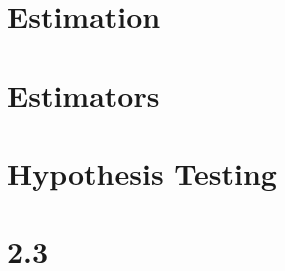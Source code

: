 \documentclass[12pt]{article}
\begin{document}
\section{Estimation}
\section{Estimators}
\section{Hypothesis Testing}





	



\section{2.3}
	\subsection{}
\end{document}
